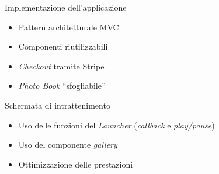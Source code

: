 \begin{frame}{Implementazione dell'applicazione}
\begin{minipage}{0.49\textwidth}
\begin{minipage}{0.32\textwidth}
				\end{minipage}
			\end{minipage}
			\begin{minipage}{0.49\textwidth}
				\begin{itemize}
					\item Pattern architetturale MVC
					\item Componenti riutilizzabili
					\item \emph{Checkout} tramite Stripe
					\item \emph{Photo Book} “sfogliabile”
				\end{itemize}
			\end{minipage}\par
			\begin{block}{Schermata di intrattenimento}
				\begin{itemize}
					\item Uso delle funzioni del \emph{Launcher} (\emph{callback} e \emph{play/pause})
					\item Uso del componente \emph{gallery}
					\item Ottimizzazione delle prestazioni
				\end{itemize}
			\end{block}
		\end{frame}
